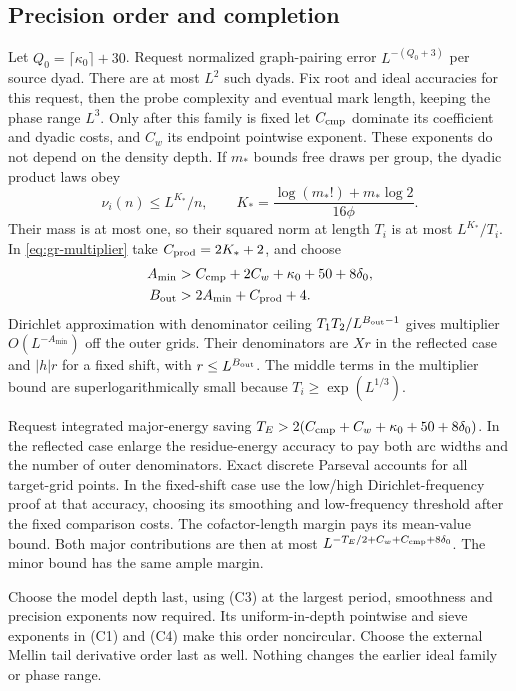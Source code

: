 \subsection{Precision order and completion}
Let \(Q_0=\lceil\kappa_0\rceil+30\).
Request normalized graph-pairing error \(L^{-(Q_0+3)}\) per source
dyad. There are at most \(L^2\) such dyads. Fix root and ideal
accuracies for this request, then the probe complexity and eventual
mark length, keeping the phase range \(L^3\).
Only after this family is fixed let \(C_{\rm cmp}\) dominate its
coefficient and dyadic costs, and \(C_w\) its endpoint pointwise
exponent. These exponents do not depend on the density depth.
If \(m_*\) bounds free draws per group, the dyadic product laws obey
\[
 \nu_i(n)\le L^{K_*}/n,\qquad
 K_*=\frac{\log(m_* !)+m_*\log2}{16\phi}.
\]
Their mass is at most one, so their squared norm at length \(T_i\)
is at most \(L^{K_*}/T_i\). In \eqref{eq:gr-multiplier} take
\(C_{\rm prod}=2K_*+2\), and choose
\begin{align}
 A_{\min}&>C_{\rm cmp}+2C_w+\kappa_0+50+8\delta_0,\notag\\
 B_{\rm out}&>2A_{\min}+C_{\rm prod}+4.\label{eq:outer-budget}
\end{align}
Dirichlet approximation with denominator ceiling
\(T_1T_2/L^{B_{\rm out}-1}\) gives multiplier \(O(L^{-A_{\min}})\)
off the outer grids. Their denominators are \(Xr\) in the reflected
case and \(|h|r\) for a fixed shift, with \(r\le L^{B_{\rm out}}\).
The middle terms in the multiplier bound are superlogarithmically
small because \(T_i\ge\exp(L^{1/3})\).

Request integrated major-energy saving
\(T_E>2(C_{\rm cmp}+C_w+\kappa_0+50+8\delta_0)\).
In the reflected case enlarge the residue-energy accuracy to pay
both arc widths and the number of outer denominators. Exact discrete
Parseval accounts for all target-grid points. In the fixed-shift case
use the low/high Dirichlet-frequency proof at that accuracy, choosing
its smoothing and low-frequency threshold after the fixed comparison
costs. The cofactor-length margin pays its mean-value bound.
Both major contributions are then at most
\(L^{-T_E/2+C_w+C_{\rm cmp}+8\delta_0}\).
The minor bound has the same ample margin.

Choose the model depth last, using (C3) at the largest period,
smoothness and precision exponents now required. Its uniform-in-depth
pointwise and sieve exponents in (C1) and (C4) make this order
noncircular. Choose the external Mellin tail derivative order last
as well. Nothing changes the earlier ideal family or phase range.

